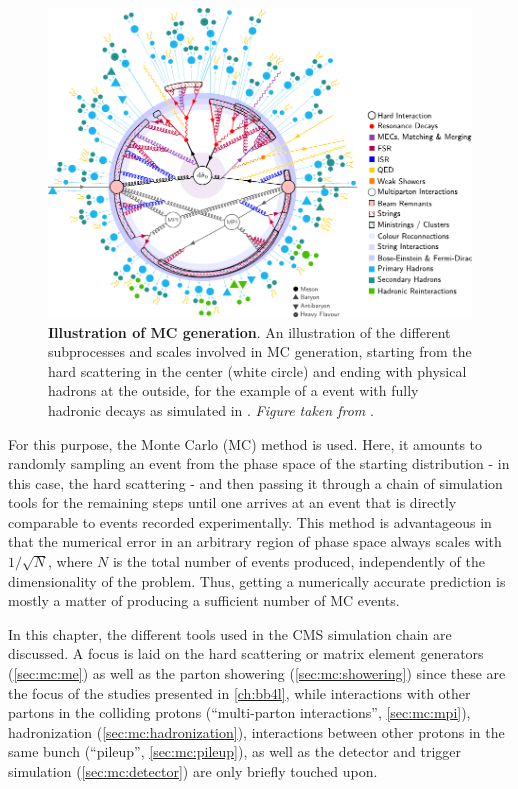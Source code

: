 \begin{figure}[!t]
    \centering
    \includegraphics[width=\textwidth]{figures/mc_sketch.pdf}
    \caption{\textbf{Illustration of MC generation}. An illustration of the different subprocesses and scales involved in MC generation, starting from the hard scattering in the center (white circle) and ending with physical hadrons at the outside, for the example of a \pptt event with fully hadronic decays as simulated in \pythia. \textit{Figure taken from }.}
    \label{fig:mc:sketch}
\end{figure}

For this purpose, the Monte Carlo (MC) method is used. Here, it amounts to randomly sampling an event from the phase space of the starting distribution - in this case, the hard scattering - and then passing it through a chain of simulation tools for the remaining steps until one arrives at an event that is directly comparable to events recorded experimentally. %
This method is advantageous in that the numerical error in an arbitrary region of phase space always scales with $1/\sqrt{N}$, where $N$ is the total number of events produced, independently of the dimensionality of the problem. Thus, getting a numerically accurate prediction is mostly a matter of producing a sufficient number of MC events.

In this chapter, the different tools used in the CMS simulation chain are discussed. A focus is laid on the hard scattering or matrix element generators (\cref{sec:mc:me}) as well as the parton showering (\cref{sec:mc:showering}) since these are the focus of the studies presented in \cref{ch:bb4l}, while interactions with other partons in the colliding protons (``multi-parton interactions'', \cref{sec:mc:mpi}), hadronization (\cref{sec:mc:hadronization}), interactions between other protons in the same bunch (``pileup'', \cref{sec:mc:pileup}), as well as the detector and trigger simulation (\cref{sec:mc:detector}) are only briefly touched upon. 

